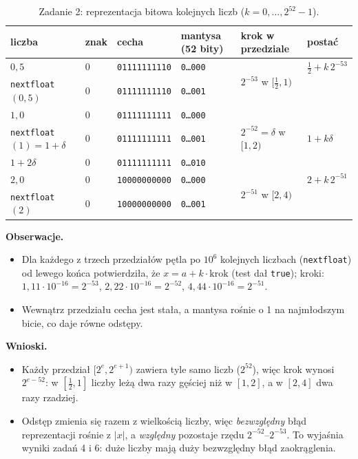\documentclass[11pt,a4paper]{article}
\begin{document}
\begin{table}[h]
\centering\footnotesize
\begin{tabular}{@{}llllll@{}}
\toprule
liczba & znak & cecha & mantysa (52 bity) & krok w przedziale & postać \\
\midrule
$0{,}5$ & 0 & \texttt{01111111110} & \texttt{0\ldots000} & \multirow{2}{*}{$2^{-53}$ w $[\tfrac12,1)$} & $\tfrac12+k\,2^{-53}$ \\
\texttt{nextfloat}$(0{,}5)$ & 0 & \texttt{01111111110} & \texttt{0\ldots001} & & \\
\midrule
$1{,}0$ & 0 & \texttt{01111111111} & \texttt{0\ldots000} & \multirow{3}{*}{$2^{-52}=\delta$ w $[1,2)$} & \multirow{3}{*}{$1+k\delta$} \\
\texttt{nextfloat}$(1)=1+\delta$ & 0 & \texttt{01111111111} & \texttt{0\ldots001} & & \\
$1+2\delta$ & 0 & \texttt{01111111111} & \texttt{0\ldots010} & & \\
\midrule
$2{,}0$ & 0 & \texttt{10000000000} & \texttt{0\ldots000} & \multirow{2}{*}{$2^{-51}$ w $[2,4)$} & $2+k\,2^{-51}$ \\
\texttt{nextfloat}$(2)$ & 0 & \texttt{10000000000} & \texttt{0\ldots001} & & \\
\bottomrule
\end{tabular}
\caption{Zadanie 2: reprezentacja bitowa kolejnych liczb ($k=0,\dots,2^{52}-1$).}
\end{table}

\textbf{Obserwacje.}
\begin{itemize}
\item Dla każdego z trzech przedziałów pętla po $10^6$ kolejnych liczbach (\texttt{nextfloat}) od lewego końca potwierdziła, że $x=a+k\cdot\mathrm{krok}$ (test dał \texttt{true}); kroki: $1{,}11\cdot10^{-16}=2^{-53}$, $2{,}22\cdot10^{-16}=2^{-52}$, $4{,}44\cdot10^{-16}=2^{-51}$.
\item Wewnątrz przedziału cecha jest stała, a mantysa rośnie o 1 na najmłodszym bicie, co daje równe odstępy.
\end{itemize}

\textbf{Wnioski.}
\begin{itemize}
\item Każdy przedział $[2^e,2^{e+1})$ zawiera tyle samo liczb ($2^{52}$), więc krok wynosi $2^{e-52}$: w $[\tfrac12,1]$ liczby leżą dwa razy gęściej niż w $[1,2]$, a w $[2,4]$ dwa razy rzadziej.
\item Odstęp zmienia się razem z wielkością liczby, więc \emph{bezwzględny} błąd reprezentacji rośnie z $|x|$, a \emph{względny} pozostaje rzędu $2^{-52}$--$2^{-53}$. To wyjaśnia wyniki zadań 4 i 6: duże liczby mają duży bezwzględny błąd zaokrąglenia.
\end{itemize}
\end{document}
